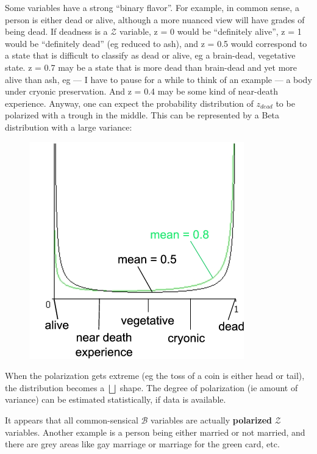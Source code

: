 Some variables have a strong ``binary flavor''.  For example, in common sense, a person is either dead or alive, although a more nuanced view will have grades of being dead.  If deadness is a $\mathcal{Z}$ variable, z = 0 would be ``definitely alive'', z = 1 would be ``definitely dead'' (eg reduced to ash), and z = 0.5 would correspond to a state that is difficult to classify as dead or alive, eg a brain-dead, vegetative state.  z = 0.7 may be a state that is more dead than brain-dead and yet more alive than ash, eg --- I have to pause for a while to think of an example --- a body under cryonic preservation.  And z = 0.4 may be some kind of near-death experience.  Anyway, one can expect the probability distribution of $z_{dead}$ to be polarized with a trough in the middle.  This can be represented by a Beta distribution with a large variance:
\begin{figure}[H]
\centering
\includegraphics{deadness.png}
\end{figure}
When the polarization gets extreme (eg the toss of a coin is either head or tail), the distribution becomes a $\bigsqcup$ shape.  The degree of polarization (ie amount of variance) can be estimated statistically, if data is available.

It appears that all common-sensical $\mathcal{B}$ variables are actually \textbf{polarized} $\mathcal{Z}$ variables.  Another example is a person being either married or not married, and there are grey areas like gay marriage or marriage for the green card, etc.


